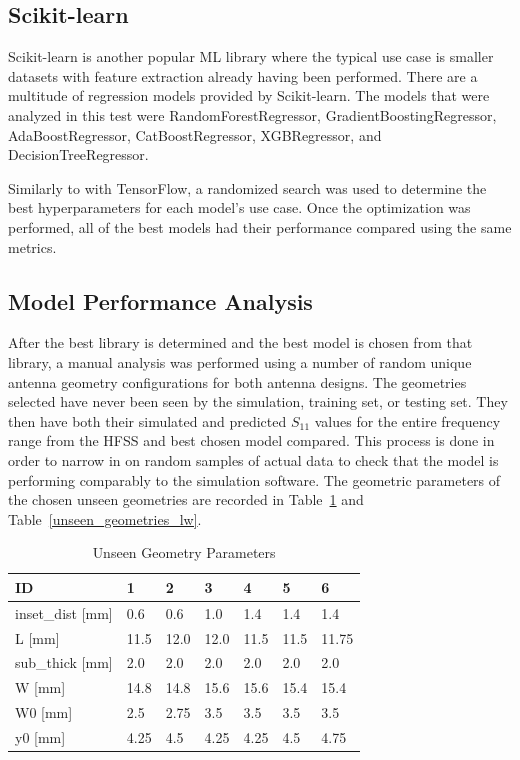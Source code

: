 \documentclass[conference]{IEEEtran}
\begin{document}
\subsection{Scikit-learn}
Scikit-learn is another popular ML library where the typical use case is smaller datasets with feature extraction already having been performed. There are a multitude of regression models provided by Scikit-learn. The models that were analyzed in this test were RandomForestRegressor, GradientBoostingRegressor, AdaBoostRegressor, CatBoostRegressor, XGBRegressor, and DecisionTreeRegressor.

Similarly to with TensorFlow, a randomized search was used to determine the best hyperparameters for each model's use case. Once the optimization was performed, all of the best models had their performance compared using the same metrics. 

\subsection{Model Performance Analysis}
After the best library is determined and the best model is chosen from that library, a manual analysis was performed using a number of random unique antenna geometry configurations for both antenna designs. The geometries selected have never been seen by the simulation, training set, or testing set. They then have both their simulated and predicted $S_{11}$ values for the entire frequency range from the HFSS and best chosen model compared. This process is done in order to narrow in on random samples of actual data to check that the model is performing comparably to the simulation software. The geometric parameters of the chosen unseen geometries are recorded in Table~\ref{unseen_geometries_p} and Table~\ref{unseen_geometries_lw}.

\begin{table}[h]
\caption{Unseen Geometry Parameters}
\begin{center}
\begin{tabular}{ |l|l|l|l|l|l|l| }
    \hline
    ID & 1 & 2 & 3 & 4 & 5 & 6 \\ 
    \hline
    inset\_dist [mm] & 0.6 & 0.6 & 1.0 & 1.4 & 1.4 & 1.4 \\
    \hline
    L [mm] & 11.5 & 12.0 & 12.0 & 11.5 & 11.5 & 11.75 \\
    \hline
    sub\_thick [mm]  & 2.0 & 2.0 & 2.0 & 2.0 & 2.0 & 2.0 \\
    \hline
    W [mm]  & 14.8 & 14.8 & 15.6 & 15.6 & 15.4 & 15.4 \\
    \hline
    W0 [mm] & 2.5 & 2.75 & 3.5 & 3.5 & 3.5 & 3.5 \\
    \hline
    y0 [mm] & 4.25 & 4.5 & 4.25 & 4.25 & 4.5 & 4.75 \\
    \hline
\end{tabular}
\end{center}
\label{unseen_geometries_p}
\end{table}    
\end{document}
